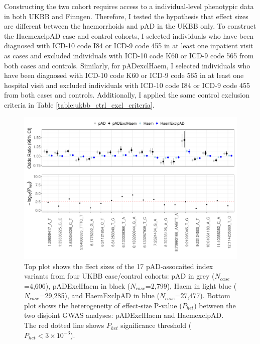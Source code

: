 Constructing the two cohort requires access to a individual-level phenotypic data in both UKBB and Finngen. Therefore, I tested the hypothesis that effect sizes are different between the haemorrhoids and pAD in the UKBB only. To construct the HaemexclpAD case and control cohorts, I selected individuals who have been diagnosed with ICD-10 code I84 or ICD-9 code 455 in at least one inpatient visit as cases and excluded individuals with ICD-10 code K60 or ICD-9 code 565 from both cases and controls. Similarly, for pADexclHaem, I selected individuals who have been diagnosed with ICD-10 code K60 or ICD-9 code 565 in at least one hospital visit and excluded individuals with ICD-10 code I84 or ICD-9 code 455 from both cases and controls. Additionally, I applied the same control exclusion criteria in Table \ref{table:ukbb_ctrl_excl_criteria}. 

\begin{figure}[H]
  \centering    
  \includegraphics[width=1.0\textwidth]{combined_forest_het_plt}
  \caption[Figure]{Top plot shows the ffect sizes of the 17 pAD-assocaited index variants from four UKBB case/control cohorts: pAD in grey ($N_{case}$=4,606), pADExclHaem in black ($N_{case}$=2,799), Haem in light blue ($N_{case}$=29,285), and HaemExclpAD in blue ($N_{case}$=27,477). Bottom plot shows the heterogeneity of effect-size P-value ($P_{het}$) between the two disjoint GWAS analyses: pADExclHaem and HaemexclpAD. The red dotted line shows $P_{het}$ significance threshold ($P_{het} < 3\times10^{-3}$).}
  \label{fig:combined_forest_het_plot}
  \end{figure}

